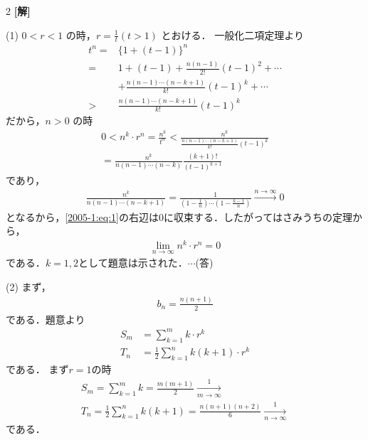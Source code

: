 \documentclass[../../main.tex]{subfiles}
\begin{document}
\setcounter{equation}{0}
\setcounter{figure}{0}
\setcounter{table}{0}
\begin{oframed}
  
\end{oframed}
\setlength{\columnseprule}{0.4pt}
\begin{multicols}{2}
  {\bf[解]}

  (1)
  $0 < r < 1$ の時，$r = \frac{1}{t} (t>1)$ とおける．
  一般化二項定理より
  \begin{align*}
    t^n
    = & \{1+(t-1)\}^n                                  \\
    = & 1 + (t-1) + \frac{n(n-1)}{2!}(t-1)^2+\cdots    \\
      & +\frac{n(n-1)\cdots(n-k+1)}{k!}(t-1)^k +\cdots \\
    > & \frac{n(n-1)\cdots(n-k+1)}{k!}(t-1)^k
  \end{align*}
  だから，$n > 0$ の時
  \begin{align}
    0 < n^k \cdot r^n = \frac{n^k}{t^n} < \frac{n^k}{\frac{n(n-1)\cdots(n-k+1)}{k!}(t-1)^k} \nonumber \\
    = \frac{n^k}{n(n-1)\cdots(n-k)}\frac{(k+1)!}{(t-1)^{k+1}}\label{2005-1:eq:1}
  \end{align}
  であり，
  \begin{align*}
    \frac{n^k }{n(n-1)\cdots(n-k+1)} = \frac{1}{\left(1-\frac{1}{n}\right)\cdots\left(1-\frac{k-1}{n}\right) } \xrightarrow{n\to\infty} 0
  \end{align*}
  となるから，\cref{2005-1:eq:1}の右辺は$0$に収束する．したがってはさみうちの定理から，
  \begin{align*}
    \lim_{n\to\infty} n^k \cdot r^n = 0
  \end{align*}
  である．$k=1,2$として題意は示された．$\cdots$(答)

  \vspace{10pt}
  (2)
  まず，
  \begin{align*}
    b_n = \frac{n(n+1)}{2}
  \end{align*}
  である．題意より
  \begin{align*}
    S_m & = \sum_{k=1}^m k \cdot r^k                 \\
    T_n & = \frac{1}{2}\sum_{k=1}^n k(k+1) \cdot r^k
  \end{align*}
  である．
  まず$r=1$の時
  \begin{align*}
    S_m = \sum_{k=1}^m k = \frac{m(m+1)}{2} \xrightarrow[m\to\infty] 1 \\
    T_n = \frac{1}{2}\sum_{k=1}^n k(k+1) = \frac{n(n+1)(n+2)}{6} \xrightarrow[n\to\infty] 1
  \end{align*}
  である．


\end{multicols}
\end{document}
